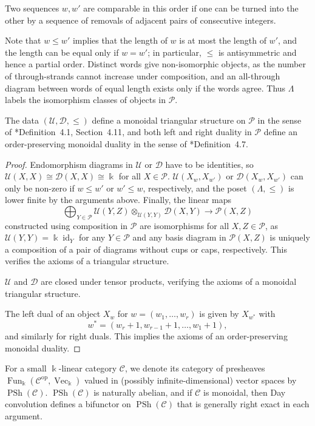 \documentclass[11pt,oneside]{amsart}
\theoremstyle{definition}
\theoremstyle{remark}
\newcommand\kk{\Bbbk}
\newcommand\cC{\mathcal C}
\newcommand\cD{\mathcal D}
\newcommand\cP{\mathcal P}
\newcommand\cU{\mathcal U}
\newcommand\id{\operatorname{id}}
\newcommand\Fun{\operatorname{Fun}}
\newcommand\PSh{\operatorname{PSh}}
\newcommand\Vect{\operatorname{Vec}}
\renewcommand\o\otimes
\renewcommand\:\colon
\newcommand\op{^{\mathrm{op}}}
\begin{document}
Two sequences $w,w'$ are comparable in this order if one can be turned into the other by a sequence of removals of adjacent pairs of consecutive integers. 

Note that $w\le w'$ implies that the length of $w$ is at most the length of $w'$, and the length can be equal only if $w=w'$; in particular, $\le$ is antisymmetric and hence a partial order.
Distinct words give non-isomorphic objects, as the number of through-strands cannot increase under composition, and an all-through diagram between words of equal length exists only if the words agree. Thus $\Lambda$ labels the isomorphism classes of objects in $\cP$.

\begin{lemma} \label{lem-1} The data $(\cU,\cD,\le)$ define a monoidal triangular structure on $\cP$ in the sense of \cite{SS}*{Definition~4.1, Section~4.11}, and both left and right duality in $\cP$ define an order-preserving monoidal duality in the sense of \cite{FG}*{Definition~4.7}.
\end{lemma}

\begin{proof} Endomorphism diagrams in $\cU$ or $\cD$ have to be identities, so $\cU(X,X)\cong\cD(X,X)\cong\kk$ for all $X\in\cP$. $\cU(X_w,X_{w'})$ or $\cD(X_w,X_{w'})$ can only be non-zero if $w\le w'$ or $w'\le w$, respectively, and the poset $(\Lambda,\le)$ is lower finite by the arguments above. Finally, the linear maps
$$
\bigoplus_{Y\in\cP}
\cU(Y,Z) \o_{\cU(Y,Y)} \cD(X,Y) \to \cP(X,Z)
$$
constructed using composition in $\cP$ are isomorphisms for all $X,Z\in\cP$, as $\cU(Y,Y)=\kk \id_Y$ for any $Y\in\cP$ and any basis diagram in $\cP(X,Z)$ is uniquely a composition of a pair of diagrams without cups or caps, respectively. This verifies the axioms of a triangular structure.

$\cU$ and $\cD$ are closed under tensor products, verifying the axioms of a monoidal triangular structure.

The left dual of an object $X_w$ for $w=(w_1,\dots,w_r)$ is given by $X_{w^*}$ with
\begin{equation}
w^*=(w_r+1,w_{r-1}+1,\dots,w_1+1) ,
\label{eq:dual-words}    
\end{equation}
and similarly for right duals. This implies the axioms of an order-preserving monoidal duality.
\end{proof}



For a small $\kk$-linear category $\cC$, we denote its category of presheaves $\Fun_\kk(\cC\op,\Vect_\kk)$ valued in (possibly infinite-dimensional) vector spaces by $\PSh(\cC)$. $\PSh(\cC)$ is naturally abelian, and if $\cC$ is monoidal, then Day convolution defines a bifunctor on $\PSh(\cC)$ that is generally right exact in each argument.
\end{document}
